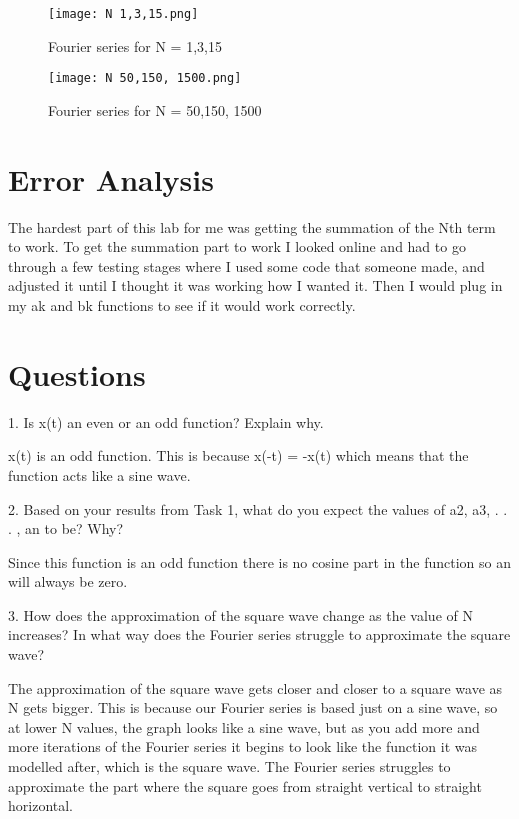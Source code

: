 \documentclass[11pt,a4]{report}
\begin{document}
\begin{figure}[h!]
    \begin{center}
  \caption{Fourier series for N = 1,3,15}
  \texttt{[image: N 1,3,15.png]}
\end{center}
\end{figure}
\newpage

\begin{figure}[h!]
    \begin{center}
  \caption{Fourier series for N = 50,150, 1500}
  \texttt{[image: N 50,150, 1500.png]}
\end{center}
\end{figure}

\section{Error Analysis}
 The hardest part of this lab for me was getting the summation of the Nth term to work. To get the summation part to work I looked online and had to go through a few testing stages where I used some code that someone made, and adjusted it until I thought it was working how I wanted it. Then I would plug in my ak and bk functions to see if it would work correctly. 
\section{Questions}
1. Is x(t) an even or an odd function? Explain why.

x(t) is an odd function. This is because x(-t) = -x(t) which means that the function acts like a sine wave.

2. Based on your results from Task 1, what do you expect the values of a2, a3, . . . , an to be? Why?

Since this function is an odd function there is no cosine part in the function so an will always be zero. 

3. How does the approximation of the square wave change as the value of N increases? In what
way does the Fourier series struggle to approximate the square wave?

The approximation of the square wave gets closer and closer to a square wave as N gets bigger. This is because our Fourier series is based just on a sine wave, so at lower N values, the graph looks like a sine wave, but as you add more and more iterations of the Fourier series it begins to look like the function it was modelled after, which is the square wave. The Fourier series struggles to approximate the part where the square goes from straight vertical to straight horizontal. 
\end{document}
